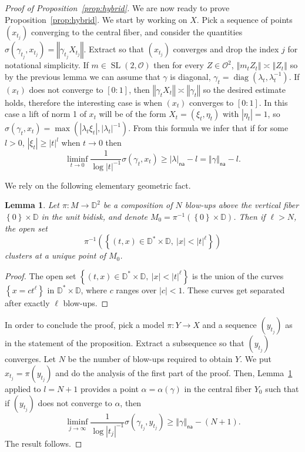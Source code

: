 \documentclass[10pt]{amsart}
\newtheorem{lemm}[theo]{Lemma}\newtheorem{prop}[theo]{Proposition}\newtheorem{coro}[theo]{Corollary}\newtheorem{conj}[theo]{Conjecture}
\theoremstyle{definition}\newtheorem{defi}[theo]{Definition}\newtheorem{rema}[theo]{Remark}\newtheorem{exam}[theo]{Example}\newtheorem{exem}[theo]{Example}\newtheorem{nota}[theo]{Notation}
\DeclareMathOperator{\SL}{SL}
\DeclareMathOperator{\diag}{diag}
\newcommand{\dD}{\mathbb{D}}
\newcommand{\cv}{\rightarrow}
\newcommand{\set}[1]{\left\{#1\right\}}
\newcommand{\norm}[1]{\left\Vert#1\right\Vert}
\newcommand{\abs}[1]{\left\vert#1\right\vert}
\newcommand{\unsur}[1]{\frac{1}{#1}}
\newcommand{\lrpar}[1]{\left(#1\right)}
\newcommand{\la}{\lambda}
\newcommand{\na}{\mathsf{na}}
\newcommand{\inv}{^{-1}}
\begin{document}
\begin{proof}[Proof of Proposition~\ref{prop:hybrid}]
We are now ready to prove Proposition~\ref{prop:hybrid}. We start by working on $X$. Pick a sequence of points $(x_{t_j})$ converging to the central fiber, and consider the quantities $\sigma(\gamma_{t_j}, x_{t_j}) = \norm{\gamma_{t_j}X_{t_j}}$. Extract so that $(x_{t_j})$ converges and drop the index $j$ for notational simplicity. If $m\in \SL(2, \mathcal{O})$ then for every $Z\in \mathcal O^2$, $\norm{ m_t Z_t}\asymp \norm{Z_t}$ so by the previous lemma we can assume that $\gamma$ is diagonal, $\gamma_t =\diag(\lambda_t, \lambda_t\inv)$. If $(x_{t})$ does not converge to $[0:1]$, then $\norm{\gamma_{t}X_{t}} \asymp \norm{\gamma_{t}}$ so the desired estimate holds, therefore the interesting case is when $(x_{t})$ converges to $[0:1]$. In this case a lift of norm 1 of $x_t$ will be of the form $X_{t} = (\xi_t, \eta_t)$ with $\abs{\eta_t} = 1$, so $\sigma (\gamma_t, x_t) = \max(\abs{\la_t\xi_t}, \abs{\la_t}\inv)$. From this formula we infer that if for some $l>0$, $\abs{\xi_t} \geq \abs{t}^l$ when $t\cv 0$ then
\[
\liminf_{t\to 0} \unsur{\log\abs{t}\inv} \sigma (\gamma_t, x_t) \geq \abs{\la}_\na -l = \norm{\gamma}_\na -l.
\]

We rely on the following elementary geometric fact.

\begin{lemm}\label{lem:geometric}
Let $\pi:M\cv \dD^2$ be a composition of $N$ blow-ups above the vertical fiber $\set{0}\times \dD$ in the unit bidisk, and denote $M_0 = \pi\inv(\set{0}\times \dD)$.
Then if $\ell>N$, the open set
\[
\pi\inv\lrpar{\set{(t,x)\in \dD^*\times \dD, \ \abs{x}<\abs{t}^\ell}}
\]
clusters at a unique point of $M_0$.
\end{lemm}
\begin{proof}
The open set $\set{(t,x)\in \dD^*\times \dD, \ \abs{x}<\abs{t}^\ell}$ is the union of the curves $\set{ x= c t^\ell}$ in $\dD^*\times \dD$, where $c$ ranges over $\abs{c}<1$. These curves get separated after exactly $\ell$ blow-ups.
\end{proof}

In order to conclude the proof, pick a model $\pi: Y\to X$ and a sequence $(y_{t_j})$ as in the statement of the proposition. Extract a subsequence so that $(y_{t_j})$ converges. Let $N$ be the number of blow-ups required to obtain $Y$. We put $x_{t_j} = \pi(y_{t_j})$ and do the analysis of the first part of the proof. Then, Lemma~\ref{lem:geometric} applied to $l = N+1$ provides a point $\alpha = \alpha(\gamma)$ in the central fiber $Y_0$ such that if $(y_{t_j})$ does not converge to $\alpha$, then
\[
\liminf_{j\cv\infty} \unsur{\log\abs{t_j}\inv} \sigma (\gamma_{t_j}, y_{t_j}) \geq \norm{\gamma}_\na -(N+1).
\]
The result follows.
\end{proof}
\end{document}
